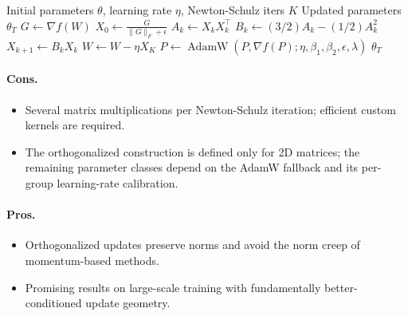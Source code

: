 \begin{algorithm}[H]
\caption{Muon (Newton-Schulz Orthogonalization)}
\label{alg:muon}
\begin{algorithmic}[1]
\Require Initial parameters $\theta$, learning rate $\eta$, Newton-Schulz iters $K$
\Ensure Updated parameters $\theta_T$
        \State $G \gets \nabla f(W)$ 
        \State $X_0 \gets \frac{G}{\|G\|_F + \epsilon}$ 
            \State $A_k \gets X_k X_k^\top$ 
            \State $B_k \gets (3/2) A_k - (1/2) A_k^2$ 
            \State $X_{k+1} \gets B_k X_k$ 
        \EndFor
        \State $W \gets W - \eta X_K$ 
    \Else
        \State $P \gets \operatorname{AdamW}(P, \nabla f(P); \eta, \beta_1, \beta_2, \epsilon, \lambda)$ 
    \EndIf
\EndFor
\Return $\theta_T$
\end{algorithmic}
\end{algorithm}

\paragraph{Cons.}
\begin{itemize}[leftmargin=*]
\item Several matrix multiplications per Newton-Schulz iteration; efficient custom kernels are required.
\item The orthogonalized construction is defined only for 2D matrices; the remaining parameter classes depend on the AdamW fallback and its per-group learning-rate calibration.
\end{itemize}

\paragraph{Pros.}
\begin{itemize}[leftmargin=*]
\item Orthogonalized updates preserve norms and avoid the norm creep of momentum-based methods.
\item Promising results on large-scale training with fundamentally better-conditioned update geometry.
\end{itemize}

